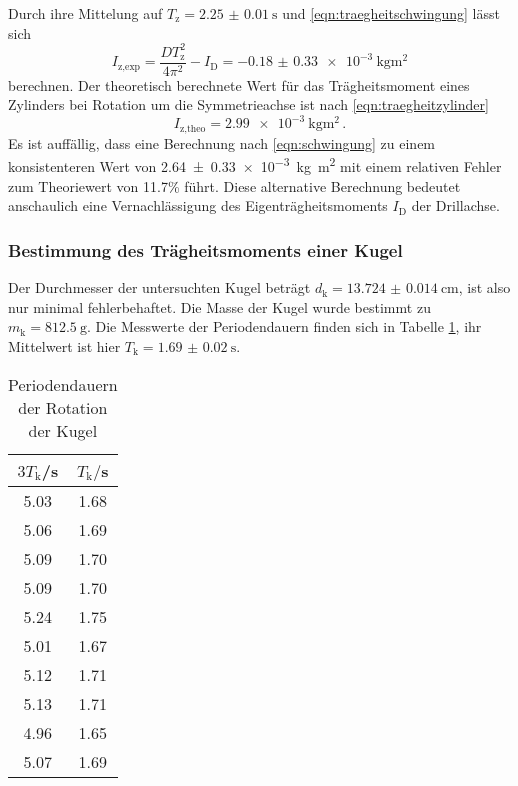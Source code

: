 Durch ihre Mittelung auf $T_{\text{z}}=\SI{2.25(001)}{\second}$ und
\eqref{eqn:traegheitschwingung} lässt sich
\begin{equation}
  I_{\text{z,exp}} = \frac{DT_{\text{z}}^2}{4\pi^2}-I_{\text{D}} = \SI{-0.18(033)e-3}{\kilogram\meter\squared}
\end{equation}
berechnen. Der theoretisch berechnete Wert für das Trägheitsmoment eines Zylinders
bei Rotation um die Symmetrieachse ist nach \eqref{eqn:traegheitzylinder}
\begin{equation}
  I_{\text{z,theo}} = \SI{2.99e-3}{\kilogram\meter\squared}\,.
\end{equation}
Es ist auffällig, dass eine Berechnung nach \eqref{eqn:schwingung} zu einem
konsistenteren Wert von \SI{2.64(033)e-3}{\kilogram\meter\squared} mit einem
relativen Fehler zum Theoriewert von 11.7\% führt. Diese alternative Berechnung
bedeutet anschaulich eine Vernachlässigung des Eigenträgheitsmoments $I_{\text{D}}$
der Drillachse.

\subsubsection{Bestimmung des Trägheitsmoments einer Kugel}
Der Durchmesser der untersuchten Kugel beträgt $d_{\text{k}}=\SI{13.724(0014)}{\cm}$,
ist also nur minimal fehlerbehaftet. Die Masse der Kugel wurde bestimmt zu
$m_{\text{k}}=\SI{812.5}{\gram}$. Die Messwerte der Periodendauern finden sich
in Tabelle \ref{tab:kugel}, ihr Mittelwert ist hier
$T_{\text{k}}=\SI{1.69(002)}{\second}$.

\begin{table}
\centering
\caption{Periodendauern der Rotation der Kugel}
\label{tab:kugel}
\begin{tabular}{c c}
\toprule
$3T_{\text{k}}$/s & $T_{\text{k}}/$s \\
\midrule
5.03 & 1.68 \\
5.06 & 1.69 \\
5.09 & 1.70 \\
5.09 & 1.70 \\
5.24 & 1.75 \\
5.01 & 1.67 \\
5.12 & 1.71 \\
5.13 & 1.71 \\
4.96 & 1.65 \\
5.07 & 1.69 \\
\bottomrule
\end{tabular}
\end{table}

